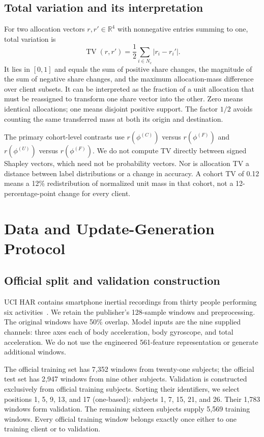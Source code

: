 \documentclass[conference,letterpaper]{IEEEtran}
\newcommand{\TV}{\operatorname{TV}}
\newcommand{\R}{\mathbb{R}}
\begin{document}
\subsection{Total variation and its interpretation}
For two allocation vectors $r,r'\in\R^4$ with nonnegative entries summing to one, total variation is
\begin{equation}
\TV(r,r')=\frac{1}{2}\sum_{i\in N_c}|r_i-r_i'|.
\label{eq:tv}
\end{equation}
It lies in $[0,1]$ and equals the sum of positive share changes, the magnitude of the sum of negative share changes, and the maximum allocation-mass difference over client subsets. It can be interpreted as the fraction of a unit allocation that must be reassigned to transform one share vector into the other. Zero means identical allocations; one means disjoint positive support. The factor $1/2$ avoids counting the same transferred mass at both its origin and destination.

The primary cohort-level contrasts use $r(\phi^{(C)})$ versus $r(\phi^{(F)})$ and $r(\phi^{(U)})$ versus $r(\phi^{(F)})$. We do not compute TV directly between signed Shapley vectors, which need not be probability vectors. Nor is allocation TV a distance between label distributions or a change in accuracy. A cohort TV of 0.12 means a 12\% redistribution of normalized unit mass in that cohort, not a 12-percentage-point change for every client.

\section{Data and Update-Generation Protocol}
\subsection{Official split and validation construction}
UCI HAR contains smartphone inertial recordings from thirty people performing six activities~\cite{har,uci}. We retain the publisher's 128-sample windows and preprocessing. The original windows have 50\% overlap. Model inputs are the nine supplied channels: three axes each of body acceleration, body gyroscope, and total acceleration. We do not use the engineered 561-feature representation or generate additional windows.

The official training set has 7,352 windows from twenty-one subjects; the official test set has 2,947 windows from nine other subjects. Validation is constructed exclusively from official training subjects. Sorting their identifiers, we select positions 1, 5, 9, 13, and 17 (one-based): subjects 1, 7, 15, 21, and 26. Their 1,783 windows form validation. The remaining sixteen subjects supply 5,569 training windows. Every official training window belongs exactly once either to one training client or to validation.
\end{document}
